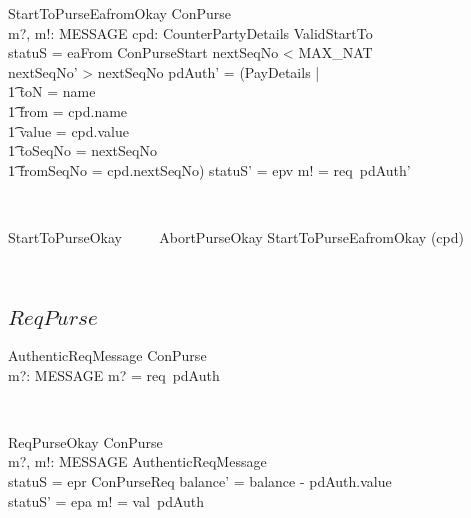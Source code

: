 \begin{LSDef}
\begin{schema}{StartToPurseEafromOkay}
   \Delta ConPurse \\
   m?, m!: MESSAGE
   \also
   cpd: CounterPartyDetails
\where
   ValidStartTo \\
   statuS = eaFrom
   \also
   \Xi ConPurseStart
   \also
   nextSeqNo < MAX\_NAT \\
   nextSeqNo' > nextSeqNo
   \also
   pdAuth' = (\mu PayDetails | \\
      \t1 toN = name \\
      \t1 \land from = cpd.name \\
      \t1 \land value = cpd.value \\
      \t1 \land toSeqNo = nextSeqNo \\
      \t1 \land fromSeqNo = cpd.nextSeqNo)
   \also
   statuS' = epv
   \also
   m! = req~pdAuth'
\end{schema}~\end{LSDef}

\begin{LSDef}
\begin{zed}
   StartToPurseOkay ~~~~ AbortPurseOkay \semi StartToPurseEafromOkay \hide (cpd)
\end{zed}~\end{LSDef}

\pagebreak
\subsection{$ReqPurse$}

\begin{LSDef}
\begin{schema}{AuthenticReqMessage}
   ConPurse \\
   m?: MESSAGE
\where
   m? = req~pdAuth
\end{schema}~\end{LSDef}

\begin{LSDef}
\begin{schema}{ReqPurseOkay}
   \Delta ConPurse \\
   m?, m!: MESSAGE
\where
   AuthenticReqMessage \\
   statuS = epr
   \also
   \Xi ConPurseReq
   \also
   balance' = balance - pdAuth.value \\
   statuS' = epa
   \also
   m! = val~pdAuth
\end{schema}~\end{LSDef}

